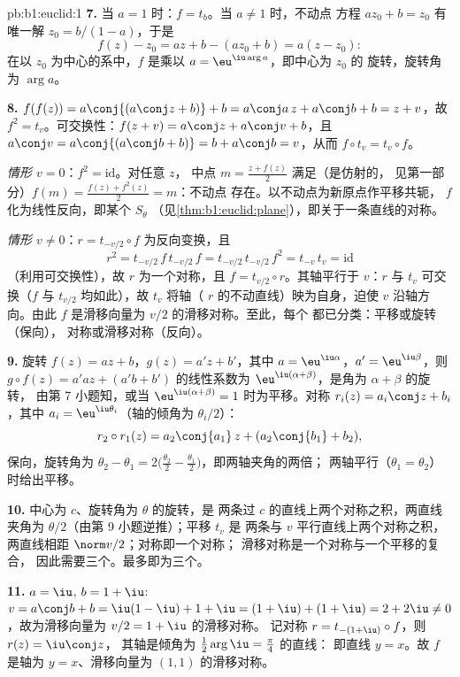 \begin{solution}{pb:b1:euclid:1}
\textbf{7.} 当 $a = 1$ 时：$f = t_b$。当 $a \neq 1$ 时，不动点
方程 $az_0 + b = z_0$ 有唯一解 $z_0 = b/(1 -
a)$，于是
\[
f(z) - z_0 = az + b - (az_0 + b) = a(z - z_0):
\]
在以 $z_0$ 为中心的系中，$f$ 是乘以 $a
= \eu^{\iu\arg a}$，即中心为 $z_0$ 的
旋转，旋转角为 $\arg a$。

\textbf{8.} $f(f(z)) = a\conj{(a\conj z + b)} + b = a\conj a\,z
+ a\conj b + b = z + v$，故 $f^2 = t_v$。可交换性：$f(z + v) =
a\conj z + a\conj v + b$，且 $a\conj v = a\conj{(a\conj b + b)}
= b + a\conj b = v$，从而 $f\circ t_v = t_v\circ f$。

\emph{情形 $v = 0$}：$f^2 = \mathrm{id}$。对任意 $z$，
中点 $m = \frac{z + f(z)}2$ 满足（是仿射的，
见第一部分）$f(m) = \frac{f(z) + f^2(z)}{2} = m$：不动点
存在。以不动点为新原点作平移共轭，
$f$ 化为线性反向，即某个 $S_\theta$
（见\cref{thm:b1:euclid:plane}），即关于一条直线的对称。

\emph{情形 $v \neq 0$}：$r = t_{-v/2}\circ f$ 为反向变换，且
\[
r^2 = t_{-v/2}\,f\,t_{-v/2}\,f = t_{-v/2}\,t_{-v/2}\,f^2
= t_{-v}\,t_v = \mathrm{id}
\]
（利用可交换性），故 $r$ 为一个对称，且 $f =
t_{v/2}\circ r$。其轴平行于 $v$：$r$ 与
$t_v$ 可交换（$f$ 与 $t_{v/2}$ 均如此），故 $t_v$ 将轴（
$r$ 的不动直线）映为自身，迫使 $v$ 沿轴方向。由此
$f$ 是滑移向量为 $v/2$ 的滑移对称。至此，每个
都已分类：平移或旋转（保向），
对称或滑移对称（反向）。

\textbf{9.} 旋转 $f(z) = az + b$，$g(z) = a'z + b'$，其中
$a = \eu^{\iu\alpha}$，$a' = \eu^{\iu\beta}$，则 $g\circ f(z) =
a'az + (a'b + b')$ 的线性系数为
$\eu^{\iu(\alpha+\beta)}$，是角为 $\alpha + \beta$ 的旋转，
由第 7 小题知，或当 $\eu^{\iu(\alpha+\beta)} =
1$ 时为平移。对称 $r_i(z) = a_i\conj z + b_i$，其中 $a_i =
\eu^{\iu\theta_i}$（轴的倾角为 $\theta_i/2$）：
\[
r_2\circ r_1(z) = a_2\conj{a_1}\,z + (a_2\conj{b_1} + b_2),
\]
保向，旋转角为 $\theta_2 - \theta_1 = 2\bigl(\tfrac{\theta_2}2
- \tfrac{\theta_1}2\bigr)$，即两轴夹角的两倍；
两轴平行（$\theta_1 = \theta_2$）时给出平移。

\textbf{10.} 中心为 $c$、旋转角为 $\theta$ 的旋转，是
两条过 $c$ 的直线上两个对称之积，两直线夹角为
$\theta/2$（由第 9 小题逆推）；平移 $t_v$ 是
两条与 $v$ 平行直线上两个对称之积，
两直线相距 $\norm v/2$；对称即一个对称；
滑移对称是一个对称与一个平移的复合，
因此需要三个。最多即为三个。

\textbf{11.} $a = \iu$, $b = 1 + \iu$: $v = a\conj b + b =
\iu(1 - \iu) + 1 + \iu = (1 + \iu) + (1 + \iu) = 2 + 2\iu \neq
0$，故为滑移向量为 $v/2 = 1 + \iu$ 的滑移对称。
记对称 $r = t_{-(1+\iu)}\circ f$，则 $r(z) = \iu\conj z$，
其轴是倾角为 $\frac12\arg\iu = \frac\pi4$ 的直线：
即直线 $y = x$。故 $f$ 是轴为 $y =
x$、滑移向量为 $(1, 1)$ 的滑移对称。


\end{solution}
